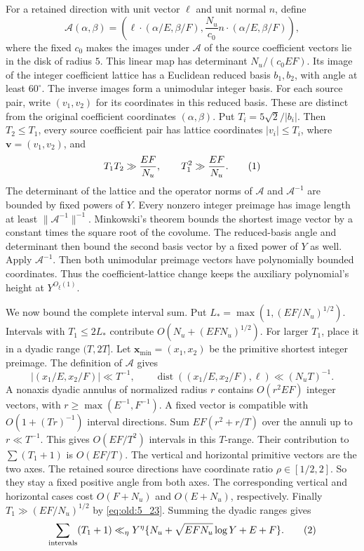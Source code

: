 For a retained direction with unit vector \(\ell\) and unit normal \(n\),
define
\[
\mathcal A(\alpha,\beta)=
 \left(\ell\cdot(\alpha/E,\beta/F),
       \frac{N_u}{c_0}n\cdot(\alpha/E,\beta/F)\right),
\]
where the fixed \(c_0\) makes the images under \(\mathcal A\)
of the source coefficient vectors lie in the disk of radius
\(5\). This linear map has determinant \(N_u/(c_0EF)\). Its image of the
integer coefficient lattice has a
Euclidean reduced basis \(b_1,b_2\), with angle at least \(60^\circ\).
The inverse images form a unimodular integer basis. For each source pair,
write \((v_1,v_2)\) for its coordinates in this reduced basis. These are
distinct from the original coefficient coordinates \((\alpha,\beta)\). Put
\(T_i=5\sqrt2/|b_i|\). Then \(T_2\le T_1\), every source coefficient
pair has lattice coordinates \(|v_i|\le T_i\), where
\(\mathbf v=(v_1,v_2)\), and
\[
 T_1T_2\gg \frac{EF}{N_u},\qquad T_1^2\gg\frac{EF}{N_u}.
\AutoTag{eq:old:5_23}
\]
The determinant of the lattice and the operator norms of \(\mathcal A\)
and \(\mathcal A^{-1}\) are bounded by fixed powers of \(Y\). Every
nonzero integer preimage has image length at least
\(\|\mathcal A^{-1}\|^{-1}\). Minkowski's theorem bounds the
shortest image vector by a constant times the square root of the
covolume. The reduced-basis angle and determinant then bound the second
basis vector by a fixed power of \(Y\) as well. Apply
\(\mathcal A^{-1}\). Then both unimodular preimage vectors have
polynomially bounded coordinates. Thus the coefficient-lattice change
keeps the auxiliary polynomial's height at \(Y^{O_\xi(1)}\).

We now bound the complete interval sum. Put
\(L_*=\max(1,(EF/N_u)^{1/2})\). Intervals with \(T_1\le2L_*\) contribute
\(O(N_u+(EFN_u)^{1/2})\). For larger \(T_1\), place it in a dyadic range
\((T,2T]\). Let \(\mathbf x_{\min}=(x_1,x_2)\) be the primitive
shortest integer preimage. The definition of \(\mathcal A\) gives
\[
 |(x_1/E,x_2/F)|\ll T^{-1},\qquad
 \operatorname{dist}((x_1/E,x_2/F),\ell)\ll (N_uT)^{-1}.
\]
A nonaxis dyadic annulus of normalized radius \(r\) contains
\(O(r^2EF)\) integer vectors, with
\(r\ge\max(E^{-1},F^{-1})\). A fixed vector is compatible with
\(O(1+(Tr)^{-1})\) interval directions. Sum
\(EF(r^2+r/T)\) over the annuli up to \(r\ll T^{-1}\). This gives
\(O(EF/T^2)\) intervals in this \(T\)-range.
Their contribution to \(\sum(T_1+1)\) is \(O(EF/T)\). The vertical and
horizontal primitive vectors are the two axes. The retained source
directions have coordinate ratio \(\rho\in[1/2,2]\). So they stay a fixed
positive angle from both axes. The corresponding vertical and horizontal
cases cost \(O(F+N_u)\) and \(O(E+N_u)\), respectively. Finally
\(T_1\gg(EF/N_u)^{1/2}\) by \eqref{eq:old:5_23}. Summing the dyadic ranges gives
\[
 \sum_{\text{intervals}}(T_1+1)
 \ll_\eta Y^\eta\{N_u+\sqrt{EFN_u}\log Y+E+F\}.
\AutoTag{eq:old:5_24}
\]

